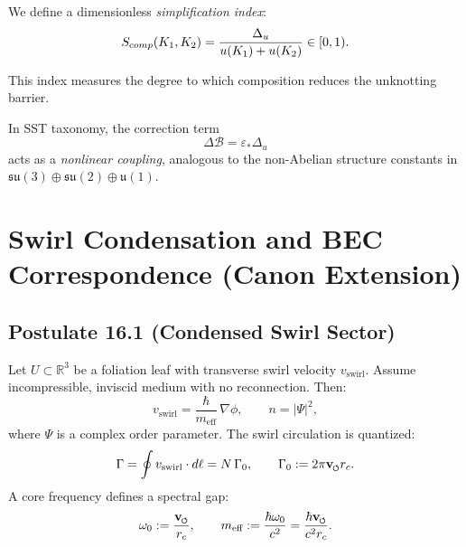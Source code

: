 \documentclass[11pt]{article}
\begin{document}
        We define a dimensionless \emph{simplification index}:
        \[
            S_{\textrm comp}(K_1,K_2)
            = \frac{\Delta_u}{u(K_1)+u(K_2)} \in [0,1).
        \]

        This index measures the degree to which composition
        reduces the unknotting barrier.

        \medskip

        In SST taxonomy, the correction term
        \[
            \Delta\mathcal B = \varepsilon_* \Delta_u
        \]
        acts as a \emph{nonlinear coupling},
        analogous to the non-Abelian structure constants
        in $\mathfrak{su}(3)\oplus\mathfrak{su}(2)\oplus\mathfrak{u}(1)$.




        \section{Swirl Condensation and BEC Correspondence (Canon Extension)}

        \subsection*{Postulate 16.1 (Condensed Swirl Sector)}
            Let $U \subset \mathbb R^3$ be a foliation leaf with transverse swirl velocity $v_{\text{swirl}}$.
            Assume incompressible, inviscid medium with no reconnection. Then:
            \begin{equation}
            v_{\text{swirl}} = \frac{\hbar}{m_{\text{eff}}}\,\nabla \phi,
            \qquad n = |\Psi|^2 ,
            \end{equation}
            where $\Psi$ is a complex order parameter. The swirl circulation is quantized:
            \begin{equation}
            \Gamma = \oint v_{\text{swirl}}\cdot d\ell = N\,\Gamma_0,
            \qquad \Gamma_0 := 2\pi \vswirl r_c .
            \end{equation}
            A core frequency defines a spectral gap:
            \begin{equation}
            \omega_0 := \frac{\vswirl}{r_c}, \qquad
            m_{\text{eff}} := \frac{\hbar \omega_0}{c^2}
            = \frac{\hbar \vswirl}{c^2 r_c}.
            \end{equation}
\end{document}
